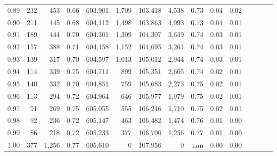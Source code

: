 \begin{tabular}{rrrcrrrrrrrrrrr}
0.89 &     232 &    453 &                                       0.66 &  603,901 &    1,709 &  103,418 &    4,538 &  0.73 &  0.04 &                         0.02 \\
0.90 &     211 &    445 &                                       0.68 &  604,112 &    1,498 &  103,863 &    4,093 &  0.73 &  0.04 &                         0.01 \\
0.91 &     189 &    444 &                                       0.70 &  604,301 &    1,309 &  104,307 &    3,649 &  0.74 &  0.03 &                         0.01 \\
0.92 &     157 &    388 &                                       0.71 &  604,458 &    1,152 &  104,695 &    3,261 &  0.74 &  0.03 &                         0.01 \\
0.93 &     139 &    317 &                                       0.70 &  604,597 &    1,013 &  105,012 &    2,944 &  0.74 &  0.03 &                         0.01 \\
0.94 &     114 &    339 &                                       0.75 &  604,711 &      899 &  105,351 &    2,605 &  0.74 &  0.02 &                         0.01 \\
0.95 &     140 &    332 &                                       0.70 &  604,851 &      759 &  105,683 &    2,273 &  0.75 &  0.02 &                         0.01 \\
0.96 &     113 &    294 &                                       0.72 &  604,964 &      646 &  105,977 &    1,979 &  0.75 &  0.02 &                         0.01 \\
0.97 &      91 &    269 &                                       0.75 &  605,055 &      555 &  106,246 &    1,710 &  0.75 &  0.02 &                         0.01 \\
0.98 &      92 &    236 &                                       0.72 &  605,147 &      463 &  106,482 &    1,474 &  0.76 &  0.01 &                         0.00 \\
0.99 &      86 &    218 &                                       0.72 &  605,233 &      377 &  106,700 &    1,256 &  0.77 &  0.01 &                         0.00 \\
1.00 &     377 &  1,256 &                                       0.77 &  605,610 &        0 &  107,956 &        0 &   nan &  0.00 &                         0.00 \\
\bottomrule
\end{tabular}
